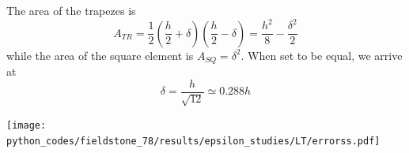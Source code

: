 The area of the trapezes is 
\[
A_{TR}=\frac12 (\frac{h}{2}+\delta) (\frac{h}{2}-\delta) = \frac{h^2}{8}- \frac{\delta^2}{2}
\]
while the area of the square element is $A_{SQ}=\delta^2$.
When set to be equal, we arrive at
\[
\delta = \frac{h}{\sqrt{12}} \simeq 0.288 h
\]


\begin{center}
\texttt{[image: python\_codes/fieldstone\_78/results/epsilon\_studies/LT/errorss.pdf]}
\end{center}





